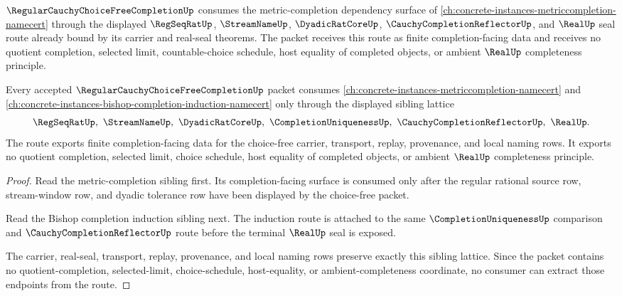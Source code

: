 $\RegularCauchyChoiceFreeCompletionUp$ consumes the metric-completion dependency surface of \autoref{ch:concrete-instances-metriccompletion-namecert} through the displayed $\RegSeqRatUp$, $\StreamNameUp$, $\DyadicRatCoreUp$, $\CauchyCompletionReflectorUp$, and $\RealUp$ seal route already bound by its carrier and real-seal theorems. The packet receives this route as finite completion-facing data and receives no quotient completion, selected limit, countable-choice schedule, host equality of completed objects, or ambient $\RealUp$ completeness principle.

\begin{theorem}
\label{thm:regular-cauchy-choice-free-completion-sibling-lattice-route}
Every accepted $\RegularCauchyChoiceFreeCompletionUp$ packet consumes \autoref{ch:concrete-instances-metriccompletion-namecert} and \autoref{ch:concrete-instances-bishop-completion-induction-namecert} only through the displayed sibling lattice
$$
\RegSeqRatUp,\ \StreamNameUp,\ \DyadicRatCoreUp,\ \CompletionUniquenessUp,\ \CauchyCompletionReflectorUp,\ \RealUp .
$$
The route exports finite completion-facing data for the choice-free carrier, transport, replay, provenance, and local naming rows. It exports no quotient completion, selected limit, choice schedule, host equality of completed objects, or ambient $\RealUp$ completeness principle.
\end{theorem}
\begin{proof}
Read the metric-completion sibling first. Its completion-facing surface is consumed only after the regular rational source row, stream-window row, and dyadic tolerance row have been displayed by the choice-free packet.

Read the Bishop completion induction sibling next. The induction route is attached to the same $\CompletionUniquenessUp$ comparison and $\CauchyCompletionReflectorUp$ route before the terminal $\RealUp$ seal is exposed.

The carrier, real-seal, transport, replay, provenance, and local naming rows preserve exactly this sibling lattice. Since the packet contains no quotient-completion, selected-limit, choice-schedule, host-equality, or ambient-completeness coordinate, no consumer can extract those endpoints from the route.
\end{proof}

